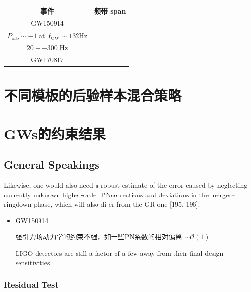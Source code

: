 \documentclass[CJK]{paper}  %
\begin{document}
	\begin{table}[h!]
		\begin{center}
			\begin{tabular}{|c|c|}
				\hline
				事件 & 频带 span \\
				\hline
				GW150914 & \makecell{$\dot{P}_\text{orb} \sim -0.1$ at $f_\text{GW} \sim 30 \text{Hz}$\\ $\dot{P}_\text{orb} \sim -1$ at $f_\text{GW} \sim 132 \text{Hz}$\\ $20--300$ Hz\cite{test_GR_GW150914}}\\
				\hline
				GW170817 & \\
				\hline
			\end{tabular}
		\end{center}
	\end{table}


\newpage
\section{不同模板的后验样本混合策略}



\newpage
\section{GWs的约束结果}
\subsection{General Speakings}
\par \cite{test_GR_GWTC3}Likewise, one would also need a robust estimate of
 the error caused by neglecting currently unknown higher-order
 PNcorrections and deviations in the merger–ringdown phase,
 which will also di er from the GR one [195, 196]. 

\begin{itemize}
	\item[$\bullet$] GW150914\cite{test_GR_GW150914}
		\par 强引力场动力学的约束不强，如一些PN系数的相对偏离 $\sim \mathcal{O}(1)$
		\par LIGO detectors are still a factor of a few away from their final design sensitivities.
\end{itemize}


\subsubsection{Residual Test}
\end{document}
